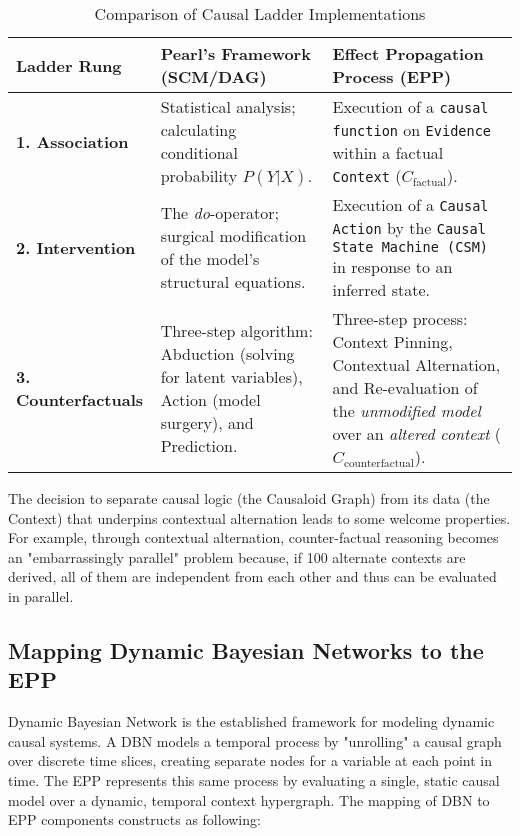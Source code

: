 \begin{table}[h!]
\centering
\caption{Comparison of Causal Ladder Implementations}
\label{tab:ladder_comparison}
\begin{tabular}{|l|p{5.5cm}|p{5.5cm}|}
\hline
\textbf{Ladder Rung} & \textbf{Pearl's Framework (SCM/DAG)} & \textbf{Effect Propagation Process (EPP)} \\
\hline
\textbf{1. Association} &
Statistical analysis; calculating conditional probability $P(Y|X)$. &
Execution of a \texttt{causal function} on \texttt{Evidence} within a factual \texttt{Context} ($C_{\text{factual}}$). \\
\hline
\textbf{2. Intervention} &
The \textit{do}-operator; surgical modification of the model's structural equations. &
Execution of a \texttt{Causal Action} by the \texttt{Causal State Machine (CSM)} in response to an inferred state. \\
\hline
\textbf{3. Counterfactuals} &
Three-step algorithm: Abduction (solving for latent variables), Action (model surgery), and Prediction. &
Three-step process: Context Pinning, Contextual Alternation, and Re-evaluation of the \textit{unmodified model} over an \textit{altered context} ($C_{\text{counterfactual}}$). \\
\hline
\end{tabular}
\end{table}

The decision to separate causal logic (the Causaloid Graph) from its data (the Context) that underpins
contextual alternation leads to some welcome properties. For example, through contextual alternation,  counter-factual reasoning becomes an "embarrassingly parallel" problem because, if 100 alternate contexts are derived, all of them are independent from each other and thus can be evaluated in parallel. 

\subsection{Mapping Dynamic Bayesian Networks to the EPP}
\label{sec:epp_Dynamic_Bayesian_Networks}

Dynamic Bayesian Network is the established framework for modeling dynamic causal systems. A DBN models a temporal process by "unrolling" a causal graph over discrete time slices, creating separate nodes for a variable at each point in time. The EPP represents this same process   by evaluating a single, static causal model over a dynamic, temporal context hypergraph. The mapping of DBN to EPP components constructs as following:
 
